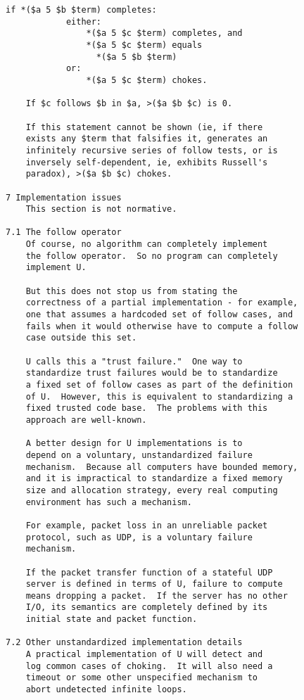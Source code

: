 \documentclass[twoside]{article}
\begin{document}
\begin{lstlisting}[label=lst:u,caption={U, 31 January 2006.  The earliest extant patriarch of the Nock family.},style=listingcode]
        if *($a 5 $b $term) completes:
            either:
                *($a 5 $c $term) completes, and
                *($a 5 $c $term) equals
                  *($a 5 $b $term)
            or:
                *($a 5 $c $term) chokes.

    If $c follows $b in $a, >($a $b $c) is 0.

    If this statement cannot be shown (ie, if there
    exists any $term that falsifies it, generates an
    infinitely recursive series of follow tests, or is
    inversely self-dependent, ie, exhibits Russell's
    paradox), >($a $b $c) chokes.

7 Implementation issues
    This section is not normative.

7.1 The follow operator
    Of course, no algorithm can completely implement
    the follow operator.  So no program can completely
    implement U.

    But this does not stop us from stating the
    correctness of a partial implementation - for example,
    one that assumes a hardcoded set of follow cases, and
    fails when it would otherwise have to compute a follow
    case outside this set.

    U calls this a "trust failure."  One way to
    standardize trust failures would be to standardize
    a fixed set of follow cases as part of the definition
    of U.  However, this is equivalent to standardizing a
    fixed trusted code base.  The problems with this
    approach are well-known.

    A better design for U implementations is to
    depend on a voluntary, unstandardized failure
    mechanism.  Because all computers have bounded memory,
    and it is impractical to standardize a fixed memory
    size and allocation strategy, every real computing
    environment has such a mechanism.

    For example, packet loss in an unreliable packet
    protocol, such as UDP, is a voluntary failure
    mechanism.

    If the packet transfer function of a stateful UDP
    server is defined in terms of U, failure to compute
    means dropping a packet.  If the server has no other
    I/O, its semantics are completely defined by its
    initial state and packet function.

7.2 Other unstandardized implementation details
    A practical implementation of U will detect and
    log common cases of choking.  It will also need a
    timeout or some other unspecified mechanism to
    abort undetected infinite loops.


\end{lstlisting}
\end{document}
